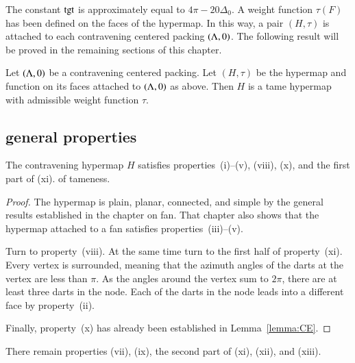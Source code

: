 The constant ${\operatorname{tgt}}$ is approximately equal to $4\pi - 20\Delta_0$.
A weight function $\tau(F)$ has been defined on the faces of the hypermap.  In this way,  a pair $(H,\tau)$ is attached to each contravening centered packing $(\Lambda,0)$.  The following result will be proved in the remaining sections of this chapter.

\begin{theorem} \label{theorem:contravene}
Let $(\Lambda,0)$ be a contravening centered packing.  Let $(H,\tau)$ be
the hypermap and function on its faces attached to $(\Lambda,0)$ as above.
Then $H$ is a tame hypermap with admissible weight function $\tau$.
\end{theorem}



\subsection{general properties}
    \label{sec:startame}



\begin{lemma} %
The contravening hypermap $H$ satisfies properties~(i)--(v),  %
(viii),  (x), and the first part of (xi).
of tameness.
\end{lemma}

\begin{proof}
The hypermap is plain, planar, connected, and simple by the general results established in the chapter on fan.  That chapter also shows that the hypermap attached to a fan satisfies properties~(iii)--(v).  

Turn to property~(viii). At the same time turn to the first half of property~(xi).  Every vertex is surrounded, meaning that the azimuth angles of the darts at the vertex are less than $\pi$.  As the angles around the vertex sum to $2\pi$, there are at least three darts in the node. Each of the darts in the node leads into a different face by property~(ii).

Finally, property~(x) has already been established in Lemma~\ref{lemma:CE}.
\end{proof}

There remain properties (vii), (ix), the second part of (xi), (xii), and (xiii).







